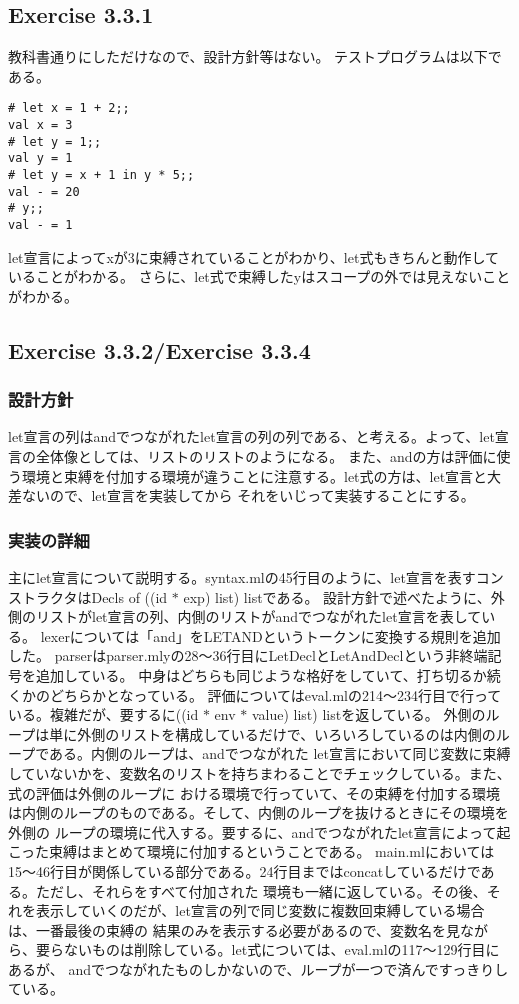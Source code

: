 \documentclass{jarticle}
\begin{document}
\subsection{Exercise 3.3.1}
教科書通りにしただけなので、設計方針等はない。
テストプログラムは以下である。
\begin{lstlisting}[basicstyle=\ttfamily\footnotesize, frame=single]
# let x = 1 + 2;;
val x = 3
# let y = 1;;
val y = 1
# let y = x + 1 in y * 5;;
val - = 20
# y;;
val - = 1
\end{lstlisting}
let宣言によってxが3に束縛されていることがわかり、let式もきちんと動作していることがわかる。
さらに、let式で束縛したyはスコープの外では見えないことがわかる。

\subsection{Exercise 3.3.2/Exercise 3.3.4}
\subsubsection{設計方針}
let宣言の列はandでつながれたlet宣言の列の列である、と考える。よって、let宣言の全体像としては、リストのリストのようになる。
また、andの方は評価に使う環境と束縛を付加する環境が違うことに注意する。let式の方は、let宣言と大差ないので、let宣言を実装してから
それをいじって実装することにする。
\subsubsection{実装の詳細}
主にlet宣言について説明する。syntax.mlの45行目のように、let宣言を表すコンストラクタはDecls of ((id $\ast$ exp) list) listである。
設計方針で述べたように、外側のリストがlet宣言の列、内側のリストがandでつながれたlet宣言を表している。
lexerについては「and」をLETANDというトークンに変換する規則を追加した。
parserはparser.mlyの28〜36行目にLetDeclとLetAndDeclという非終端記号を追加している。
中身はどちらも同じような格好をしていて、打ち切るか続くかのどちらかとなっている。
評価についてはeval.mlの214〜234行目で行っている。複雑だが、要するに((id $\ast$ env $\ast$ value) list) listを返している。
外側のループは単に外側のリストを構成しているだけで、いろいろしているのは内側のループである。内側のループは、andでつながれた
let宣言において同じ変数に束縛していないかを、変数名のリストを持ちまわることでチェックしている。また、式の評価は外側のループに
おける環境で行っていて、その束縛を付加する環境は内側のループのものである。そして、内側のループを抜けるときにその環境を外側の
ループの環境に代入する。要するに、andでつながれたlet宣言によって起こった束縛はまとめて環境に付加するということである。
main.mlにおいては15〜46行目が関係している部分である。24行目まではconcatしているだけである。ただし、それらをすべて付加された
環境も一緒に返している。その後、それを表示していくのだが、let宣言の列で同じ変数に複数回束縛している場合は、一番最後の束縛の
結果のみを表示する必要があるので、変数名を見ながら、要らないものは削除している。let式については、eval.mlの117〜129行目にあるが、
andでつながれたものしかないので、ループが一つで済んですっきりしている。
\end{document}
